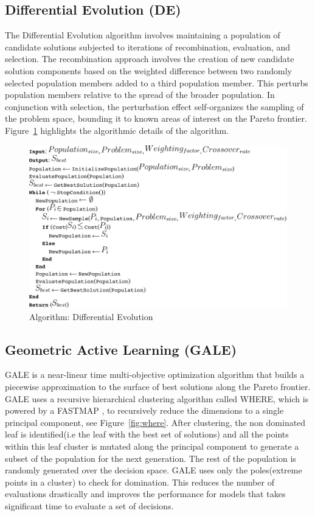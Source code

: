 \documentclass[conference]{IEEEtran}
\newcommand{\fig}[1]{Figure~\ref{fig:#1}}
\begin{document}
	\subsection{Differential Evolution (DE)} 
	
	The Differential Evolution algorithm involves maintaining a population of candidate solutions subjected to iterations of recombination, evaluation, and selection. The recombination approach involves the creation of new candidate solution components based on the weighted difference between two randomly selected population members added to a third population member. This perturbs population members relative to the spread of the broader population. In conjunction with selection, the perturbation effect self-organizes the sampling of the problem space, bounding it to known areas of interest on the Pareto frontier. \fig{de} highlights the algorithmic details of the algorithm.
	
	\begin{figure}[h]
		\begin{mdframed}
			\includegraphics[width=\linewidth]{img/de.png}
		\end{mdframed}
		\caption{Algorithm: Differential Evolution}	
		\label{fig:de}
	\end{figure}
	
	
	\subsection{Geometric Active Learning (GALE)} 
	
	GALE is a near-linear time multi-objective optimization algorithm that builds a piecewise approximation to the surface of best solutions along the Pareto frontier. GALE uses a recursive hierarchical clustering algorithm called WHERE, which is powered by a FASTMAP \cite{faloutsos95}, to recursively reduce the dimensions to a single principal component, see \fig{where}. After clustering, the non dominated leaf is identified(i.e the leaf with the best set of solutions) and all the points within this leaf cluster is mutated along the principal component to generate a subset of the population for the next generation. The rest of the population is randomly generated over the decision space. GALE uses only the poles(extreme points in a cluster) to check for domination. This reduces the number of evaluations drastically and improves the performance for models that takes significant time to evaluate a set of decisions.
	
\end{document}
